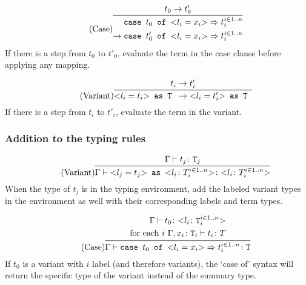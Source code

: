 \begin{equation*}
    \tag{Case}
    \infer{
        \begin{split}
            \texttt{case } t_0 \texttt{ of } \text{<}l_i=x_i\text{>} \Rightarrow t_i^{i \in 1..n} \\
            \rightarrow \texttt{case } t'_0 \texttt{ of } \text{<}l_i=x_i\text{>} \Rightarrow t_i^{i \in 1..n}
        \end{split}
    }{
        t_0 \rightarrow t'_0
    }
\end{equation*}
If there is a step from $t_0$ to $t'_0$, evaluate the term
in the case clause before applying any mapping.

\begin{equation*}
    \tag{Variant}
    \infer{
        \text{<}l_i=t_i\text{>} \texttt{ as T } \rightarrow \text{<}l_i=t'_i\text{>} \texttt{ as T }
    }{
        t_i \rightarrow t'_i
    }
\end{equation*}
If there is a step from $t_i$ to $t'_i$, evaluate the term
in the variant.

\subsubsection{Addition to the typing rules \cite{pierce2002ProgLang}}
\begin{equation*}
    \tag{Variant}
    \infer{
    \Gamma \vdash \text{<}l_j=t_j\text{>} \texttt{ as } \text{<}l_i \colon T_i^{i \in 1..n}\text{>} \colon \text{<}l_i \colon T_i^{i \in 1..n}\text{>}
    }{
    \Gamma \vdash t_j \colon \texttt{T}_j
    }
\end{equation*}
When the type of $t_j$ is in the typing environment, add the labeled
variant types in the environment as well with their corresponding labels and
term types.

\begin{equation*}
    \tag{Case}
    \infer{
    \Gamma \vdash \texttt{case } t_0 \texttt{ of } \text{<}l_i=x_i\text{>} \Rightarrow t_i^{i \in 1..n} \colon \texttt{T}
    }{
    \begin{split}
        \Gamma \vdash t_0 \colon \text{<}l_i \colon \texttt{T}_i^{i \in 1..n}\text{>} \\
        \text{for each } i \text{    } \Gamma, x_i \colon \texttt{T}_i \vdash t_i \colon T
    \end{split}
    }
\end{equation*}
If $t_0$ is a variant with $i$ label (and therefore variants), the `case of' syntax
will return the specific type of the variant instead of the summary type.

